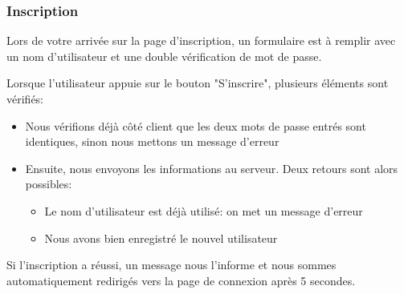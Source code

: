 \documentclass[12pt,french]{article}
\begin{document}
\subsubsection{Inscription}

Lors de votre arrivée sur la page d'inscription, un formulaire est à remplir avec un nom d'utilisateur et une double vérification de mot de passe.

Lorsque l'utilisateur appuie sur le bouton "S'inscrire", plusieurs éléments sont vérifiés:

\begin{itemize}
	\item Nous vérifions déjà côté client que les deux mots de passe entrés sont identiques, sinon nous mettons un message d'erreur
	\item Ensuite, nous envoyons les informations au serveur. Deux retours sont alors possibles:
	\begin{itemize}
		\item Le nom d'utilisateur est déjà utilisé: on met un message d'erreur
		\item Nous avons bien enregistré le nouvel utilisateur
	\end{itemize}
\end{itemize}

Si l'inscription a réussi, un message nous l'informe et nous sommes automatiquement redirigés vers la page de connexion après 5 secondes.
\end{document}
